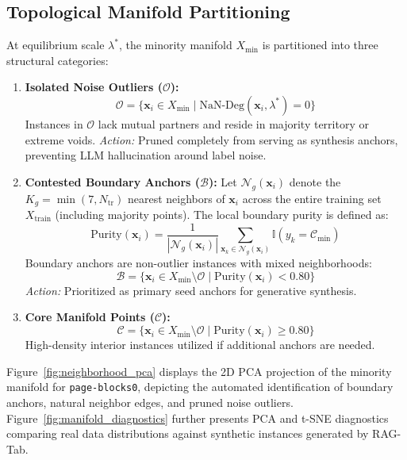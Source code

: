 \documentclass[sn-basic]{sn-jnl}
\begin{document}
\subsection{Topological Manifold Partitioning}
\label{subsec:manifold_partitioning}
At equilibrium scale $\lambda^*$, the minority manifold $X_{\min}$ is partitioned into three structural categories:
\begin{enumerate}
    \item \textbf{Isolated Noise Outliers ($\mathcal{O}$):}
    \begin{equation}
    \label{eq:outliers}
    \mathcal{O} = \{\mathbf{x}_i \in X_{\min} \mid \text{NaN-Deg}(\mathbf{x}_i, \lambda^*) = 0\}
    \end{equation}
    Instances in $\mathcal{O}$ lack mutual partners and reside in majority territory or extreme voids. \emph{Action:} Pruned completely from serving as synthesis anchors, preventing LLM hallucination around label noise.
    \item \textbf{Contested Boundary Anchors ($\mathcal{B}$):}
    Let $\mathcal{N}_g(\mathbf{x}_i)$ denote the $K_g = \min(7, N_{\text{tr}})$ nearest neighbors of $\mathbf{x}_i$ across the entire training set $X_{\text{train}}$ (including majority points). The local boundary purity is defined as:
    \begin{equation}
    \label{eq:purity}
    \text{Purity}(\mathbf{x}_i) = \frac{1}{|\mathcal{N}_g(\mathbf{x}_i)|} \sum_{\mathbf{x}_k \in \mathcal{N}_g(\mathbf{x}_i)} \mathbb{I}(y_k = \mathcal{C}_{\min})
    \end{equation}
    Boundary anchors are non-outlier instances with mixed neighborhoods:
    \begin{equation}
    \label{eq:boundary_anchors}
    \mathcal{B} = \{\mathbf{x}_i \in X_{\min} \setminus \mathcal{O} \mid \text{Purity}(\mathbf{x}_i) < 0.80\}
    \end{equation}
    \emph{Action:} Prioritized as primary seed anchors for generative synthesis.
    \item \textbf{Core Manifold Points ($\mathcal{C}$):}
    \begin{equation}
    \label{eq:core_points}
    \mathcal{C} = \{\mathbf{x}_i \in X_{\min} \setminus \mathcal{O} \mid \text{Purity}(\mathbf{x}_i) \ge 0.80\}
    \end{equation}
    High-density interior instances utilized if additional anchors are needed.
\end{enumerate}

Figure~\ref{fig:neighborhood_pca} displays the 2D PCA projection of the minority manifold for \texttt{page-blocks0}, depicting the automated identification of boundary anchors, natural neighbor edges, and pruned noise outliers. Figure~\ref{fig:manifold_diagnostics} further presents PCA and t-SNE diagnostics comparing real data distributions against synthetic instances generated by RAG-Tab.
\end{document}
